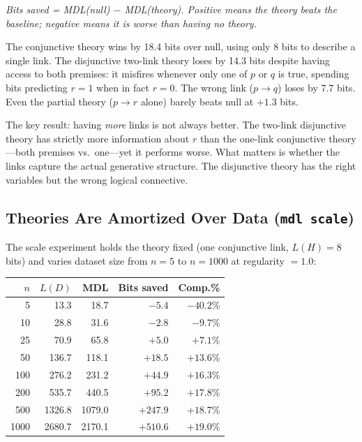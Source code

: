 \textit{Bits saved = MDL(null) $-$ MDL(theory). Positive means the
theory beats the baseline; negative means it is worse than having no
theory.}

The conjunctive theory wins by 18.4 bits over null, using only 8 bits
to describe a single link. The disjunctive two-link theory loses by
14.3 bits despite having access to both premises: it misfires whenever
only one of $p$ or $q$ is true, spending bits predicting $r = 1$ when
in fact $r = 0$. The wrong link ($p \to q$) loses by 7.7 bits. Even
the partial theory ($p \to r$ alone) barely beats null at $+1.3$ bits.

The key result: having \emph{more} links is not always better. The
two-link disjunctive theory has strictly more information about $r$
than the one-link conjunctive theory---both premises vs.\ one---yet
it performs worse. What matters is whether the links capture the actual
generative structure. The disjunctive theory has the right variables
but the wrong logical connective.

\subsection{Theories Are Amortized Over Data (\texttt{mdl scale})}

The scale experiment holds the theory fixed (one conjunctive link,
$L(H) = 8$ bits) and varies dataset size from $n = 5$ to $n = 1000$
at regularity $= 1.0$:

\begin{center}
\begin{tabular}{rrrrr}
\toprule
$n$ & $L(D)$ & MDL & Bits saved & Comp.\% \\
\midrule
5    &   13.3 &  18.7 &  $-5.4$ & $-40.2$\% \\
10   &   28.8 &  31.6 &  $-2.8$ &  $-9.7$\% \\
25   &   70.9 &  65.8 &  $+5.0$ &  $+7.1$\% \\
50   &  136.7 & 118.1 & $+18.5$ & $+13.6$\% \\
100  &  276.2 & 231.2 & $+44.9$ & $+16.3$\% \\
200  &  535.7 & 440.5 & $+95.2$ & $+17.8$\% \\
500  & 1326.8 &1079.0 &$+247.9$ & $+18.7$\% \\
1000 & 2680.7 &2170.1 &$+510.6$ & $+19.0$\% \\
\bottomrule
\end{tabular}
\end{center}

